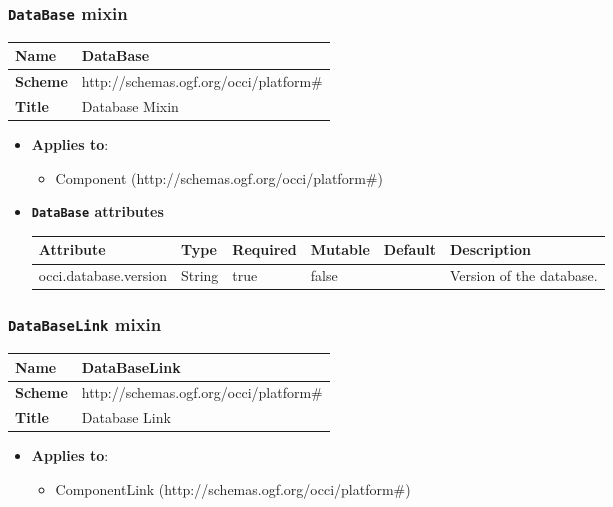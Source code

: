  
\subsubsection{\texttt{DataBase} mixin}
\begin{center}
\begin{tabular}{|l|l|}
  \hline
  \textbf{Name} & DataBase \\
  \hline  
  \textbf{Scheme} & http://schemas.ogf.org/occi/platform\# \\
  \hline
  \textbf{Title} & Database Mixin \\
  \hline
\end{tabular}
\end{center}
\begin{itemize}
\item \textbf{Applies to}:
\begin{itemize}
	\item Component (http://schemas.ogf.org/occi/platform\#)
\end{itemize}
\end{itemize} 

\begin{itemize}
\item \textbf{\texttt{DataBase} attributes}

\begin{tabularx}{\textwidth}{|l|l|p{1.4cm}|p{1.3cm}|l|X|}
  \hline
  \textbf{Attribute} & \textbf{Type} & \textbf{Required} & \textbf{Mutable} & \textbf{Default} & \textbf{Description} \\
  \hline  
  occi.database.version & String & true & false &  & Version of the database. \\
  \hline
\end{tabularx}
\end{itemize}


 
\subsubsection{\texttt{DataBaseLink} mixin}
\begin{center}
\begin{tabular}{|l|l|}
  \hline
  \textbf{Name} & DataBaseLink \\
  \hline  
  \textbf{Scheme} & http://schemas.ogf.org/occi/platform\# \\
  \hline
  \textbf{Title} & Database Link \\
  \hline
\end{tabular}
\end{center}
\begin{itemize}
\item \textbf{Applies to}:
\begin{itemize}
	\item ComponentLink (http://schemas.ogf.org/occi/platform\#)
\end{itemize}
\end{itemize} 

